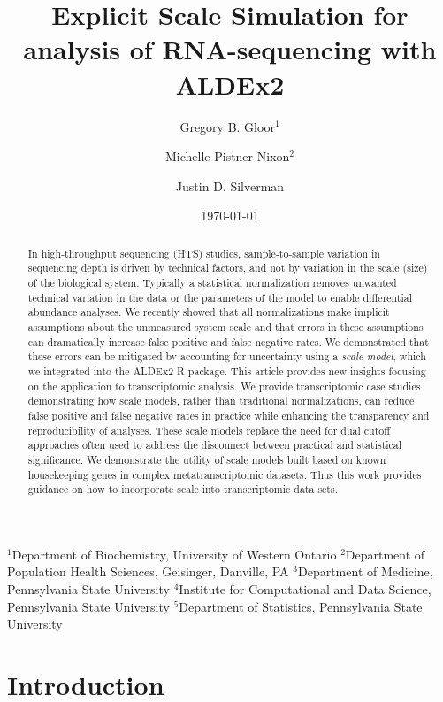 \documentclass[
]{article}
\title{Explicit Scale Simulation for analysis of RNA-sequencing \DIFdelbegin \DIFdel{count
data }\DIFdelend with
ALDEx2}
\author{Gregory B. Gloor$^1$ \and Michelle Pistner Nixon$^2$ \and Justin D. Silverman\DIFdelbegin \DIFdel{$^{3,4,5}$}\DIFdelend \DIFaddbegin \DIFadd{$^{2,3,4,5}$}\DIFaddend }
\date{\today}
\providecommand{\DIFdelbegin}{} %
\providecommand{\DIFdelend}{} %
\newcommand{\DIFscaledelfig}{0.5}
\newlength{\DIFdelgraphicswidth} %
\newlength{\DIFdelgraphicsheight} %
\newcommand{\DIFdelincludegraphics}[2][]{%
\sbox{\DIFdelgraphicsbox}{\DIFOincludegraphics[#1]{#2}}%
\settoboxwidth{\DIFdelgraphicswidth}{\DIFdelgraphicsbox} %
\settoboxtotalheight{\DIFdelgraphicsheight}{\DIFdelgraphicsbox} %
\scalebox{\DIFscaledelfig}{%
\parbox[b]{\DIFdelgraphicswidth}{\usebox{\DIFdelgraphicsbox}\\[-\baselineskip] \rule{\DIFdelgraphicswidth}{0em}}\llap{\resizebox{\DIFdelgraphicswidth}{\DIFdelgraphicsheight}{%
\setlength{\unitlength}{\DIFdelgraphicswidth}%
\begin{picture}(1,1)%
\thicklines\linethickness{2pt} %
{\color[rgb]{1,0,0}\put(0,0){\framebox(1,1){}}}%
{\color[rgb]{1,0,0}\put(0,0){\line( 1,1){1}}}%
{\color[rgb]{1,0,0}\put(0,1){\line(1,-1){1}}}%
\end{picture}%
}\hspace*{3pt}}} %
} %
\DeclareRobustCommand{\DIFdelbegin}{\DIFOdelbegin \let\includegraphics\DIFdelincludegraphics} %
\DeclareRobustCommand{\DIFdelend}{\DIFOaddend \let\includegraphics\DIFOincludegraphics} %
\begin{document}
\maketitle

$^1$Department of Biochemistry, University of Western Ontario
$^2$Department of Population Health Sciences, Geisinger, Danville, PA
$^3$Department of Medicine, Pennsylvania State University
$^4$Institute for Computational and Data Science, Pennsylvania State University
$^5$Department of Statistics, Pennsylvania State University

\begin{abstract}
In high-throughput sequencing (HTS) studies, sample-to-sample variation
in sequencing depth is driven by technical factors, and not by variation
in the scale (size) of the biological system. Typically a statistical
normalization removes unwanted technical variation in the data or the
parameters of the model to enable differential abundance analyses. We
recently showed that all normalizations make implicit assumptions about
the unmeasured system scale and that errors in these assumptions can
dramatically increase false positive and false negative rates. We
demonstrated that these errors can be mitigated by accounting for
uncertainty using a \emph{scale model}, which we integrated into the
ALDEx2 R package. This article provides new insights focusing on the
application to transcriptomic analysis. We provide transcriptomic case
studies demonstrating how scale models, rather than traditional
normalizations, can reduce false positive and false negative rates in
practice while enhancing the transparency and reproducibility of
analyses. These scale models replace the need for dual cutoff approaches
often used to address the disconnect between practical and statistical
significance. We demonstrate the utility of scale models built based on
known housekeeping genes in complex metatranscriptomic datasets. Thus
this work provides guidance on how to incorporate scale into
transcriptomic data sets.
\end{abstract}

\section{Introduction}\label{introduction}

\doublespacing 
\singlespacing
\DIFdelbegin %
\DIFdelend 
\end{document}
